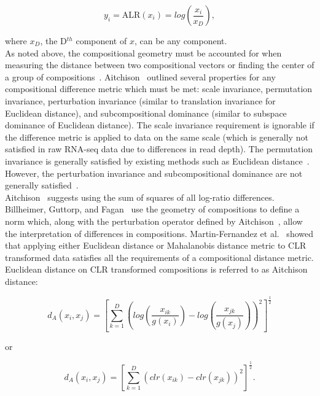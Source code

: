 \documentclass{article}\usepackage[]{graphicx}\usepackage[]{color}
\theoremstyle{definition}
\begin{document}
\begin{equation}
y_i  = \text{ALR}(x_i) = log \left(\frac{x_i}{x_D} \right),
\label{alr}
\end{equation}

where $x_D$, the D$^{th}$ component of $x$, can be any component.  \\  

As noted above, the compositional geometry must be accounted for when measuring the distance between two compositional vectors or finding the center of a group of compositions~\cite{Aitchison2000}.  Aitchison~\cite{Aitchison1992} outlined several properties for any compositional difference metric which must be met: scale invariance, permutation invariance, perturbation invariance (similar to translation invariance for Euclidean distance), and subcompositional dominance (similar to subspace dominance of Euclidean distance).  The scale invariance requirement is ignorable if the difference metric is applied to data on the same scale (which is generally not satisfied in raw RNA-seq data due to differences in read depth). The permutation invariance is generally satisfied by existing methods such as Euclidean distance~\cite{Martin-Fernandez1998}. However, the perturbation invariance and subcompositional dominance are not generally satisfied~\cite{Martin-Fernandez1998}. \\

Aitchison~\cite{Aitchison1986, Aitchison1992} suggests using the sum of squares of all log-ratio differences.  Billheimer, Guttorp, and Fagan~\cite{Billheimer2001} use the geometry of compositions to define a norm which, along with the perturbation operator defined by Aitchison~\cite{Aitchison1986}, allow the interpretation of differences in compositions. Martin-Fernandez et al.~\cite{Martin-Fernandez1998} showed that applying either Euclidean distance or Mahalanobis distance metric to CLR transformed data satisfies all the requirements of a compositional distance metric. Euclidean distance on CLR transformed compositions is referred to as Aitchison distance:

\begin{equation}
d_A(x_i, x_j) = \left[\sum_{k=1}^D \left( log \left(\frac{x_{ik}}{g(x_i)} \right) - log \left(\frac{x_{jk}}{g(x_j)} \right) \right)^2  \right]^\frac{1}{2}
\label{aitchdist1}
\end{equation}


or

\begin{equation}
d_A(x_i, x_j) = \left[\sum_{k=1}^D \left( clr(x_{ik}) - clr(x_{jk}) \right)^2  \right]^\frac{1}{2}.
\label{aitchdist2}
\end{equation}
\\
\end{document}

